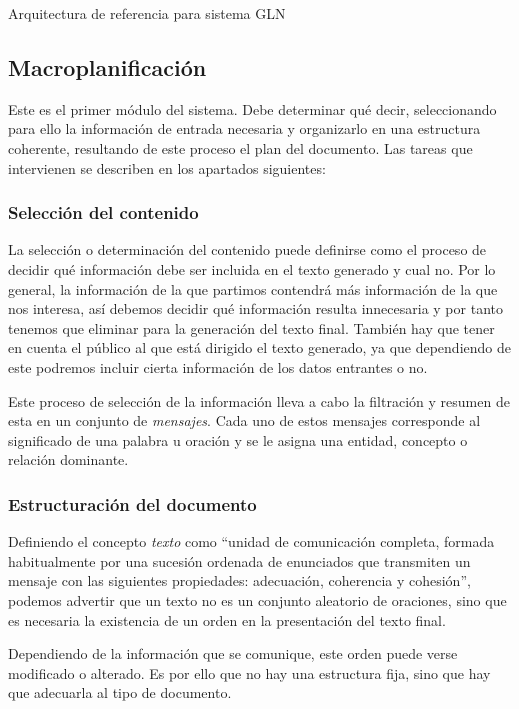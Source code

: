 %
{Arquitectura de referencia para sistema GLN \citep{vicente2015generacion}}

\subsection{Macroplanificación}
Este es el primer módulo del sistema. Debe determinar qué decir, seleccionando para ello la información de entrada necesaria y organizarlo en una estructura coherente, resultando de este proceso el plan del documento. Las tareas que intervienen se describen en los apartados siguientes: 

\subsubsection{Selección del contenido}
La selección o determinación del contenido puede definirse como el proceso de decidir qué información debe ser incluida en el texto generado y cual no. Por lo general, la información de la que partimos contendrá más información de la que nos interesa, así debemos decidir qué información resulta innecesaria y por tanto tenemos que eliminar para la generación del texto final. También hay que tener en cuenta el público al que está dirigido el texto generado, ya que dependiendo de este podremos incluir cierta información de los datos entrantes o no.

Este proceso de selección de la información lleva a cabo la filtración y resumen de esta en un conjunto de \textit{mensajes}. Cada uno de estos mensajes corresponde al significado de una palabra u oración y se le asigna una entidad, concepto o relación dominante.

\subsubsection{Estructuración del documento}
Definiendo el concepto \textit{texto} como ``unidad de comunicación completa, formada habitualmente por una sucesión ordenada de enunciados que transmiten un mensaje con las siguientes propiedades: adecuación, coherencia y cohesión'', podemos advertir que un texto no es un conjunto aleatorio de oraciones, sino que es necesaria la existencia de un orden en la presentación del texto final.

Dependiendo de la información que se comunique, este orden puede verse modificado o alterado. Es por ello que no hay una estructura fija, sino que hay que adecuarla al tipo de documento.

